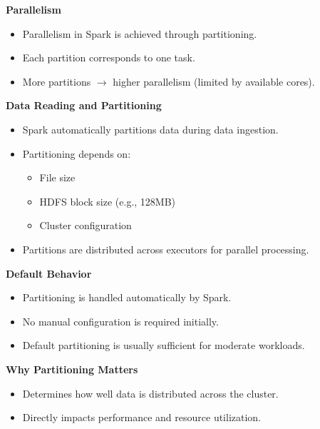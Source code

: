 \documentclass[10pt,a4paper]{article}
\begin{document}
	\textbf{Parallelism}
	\begin{itemize}
	    \item Parallelism in Spark is achieved through partitioning.
	    \item Each partition corresponds to one task.
	    \item More partitions $\rightarrow$ higher parallelism (limited by available cores).
	\end{itemize}
	
	\textbf{Data Reading and Partitioning}
	\begin{itemize}
	    \item Spark automatically partitions data during data ingestion.
	    \item Partitioning depends on:
	    \begin{itemize}
	        \item File size
	        \item HDFS block size (e.g., 128MB)
	        \item Cluster configuration
	    \end{itemize}
	    \item Partitions are distributed across executors for parallel processing.
	\end{itemize}
	
	\textbf{Default Behavior}
	\begin{itemize}
	    \item Partitioning is handled automatically by Spark.
	    \item No manual configuration is required initially.
	    \item Default partitioning is usually sufficient for moderate workloads.
	\end{itemize}
	
	\textbf{Why Partitioning Matters}
	\begin{itemize}
	    \item Determines how well data is distributed across the cluster.
	    \item Directly impacts performance and resource utilization.
	\end{itemize}
	
\end{document}

